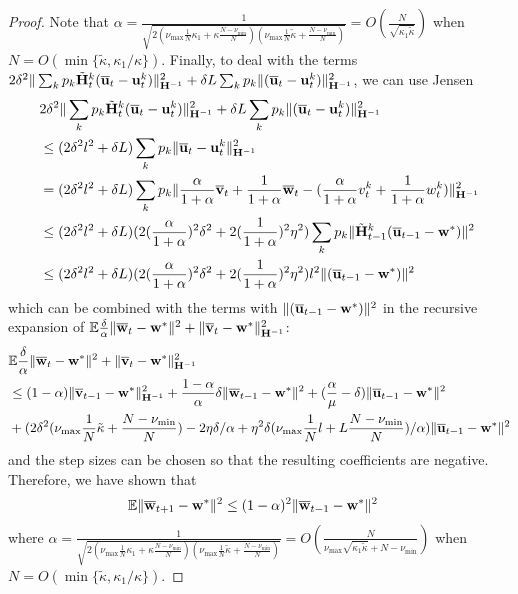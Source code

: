 \begin{proof}
	Note that $\alpha=\frac{1}{\sqrt{2(\nu_{\max}\frac{1}{N}\kappa_{1}+\kappa\frac{N-\nu_{\min}}{N})(\nu_{\max}\frac{1}{N}\tilde{\kappa}+\frac{N-\nu_{\min}}{N})}}=O(\frac{N}{\sqrt{\kappa_{1}\tilde{\kappa}}})$
	when $N=O(\min\{\tilde{\kappa},\kappa_{1}/\kappa\})$. Finally, to
	deal with the terms $2\delta^{2}\|\sum_{k}p_{k}\tilde{{\mathbf{H}}}_{t}^{k}({\overline{\mathbf{u}}}_{t}-{\mathbf{u}}_{t}^{k})\|_{{\mathbf{H}}^{-1}}^{2}+\delta L\sum_{k}p_{k}\|({\overline{\mathbf{u}}}_{t}-{\mathbf{u}}_{t}^{k})\|_{{\mathbf{H}}^{-1}}^{2}$,
	we can use Jensen
	\begin{align*}
	&2\delta^{2}\|\sum_{k}p_{k}\tilde{{\mathbf{H}}}_{t}^{k}({\overline{\mathbf{u}}}_{t}-{\mathbf{u}}_{t}^{k})\|_{{\mathbf{H}}^{-1}}^{2}+\delta L\sum_{k}p_{k}\|({\overline{\mathbf{u}}}_{t}-{\mathbf{u}}_{t}^{k})\|_{{\mathbf{H}}^{-1}}^{2} \\
	& \leq(2\delta^{2}l^{2}+\delta L)\sum_{k}p_{k}\|{\overline{\mathbf{u}}}_{t}-{\mathbf{u}}_{t}^{k}\|_{{\mathbf{H}}^{-1}}^{2}\\
	& =(2\delta^{2}l^{2}+\delta L)\sum_{k}p_{k}\|\frac{\alpha}{1+\alpha}{\overline{\mathbf{v}}}_{t}+\frac{1}{1+\alpha}{\overline{\mathbf{w}}}_{t}-(\frac{\alpha}{1+\alpha}v_{t}^{k}+\frac{1}{1+\alpha}w_{t}^{k})\|_{{\mathbf{H}}^{-1}}^{2}\\
	& \leq(2\delta^{2}l^{2}+\delta L)(2(\frac{\alpha}{1+\alpha})^{2}\delta^{2}+2(\frac{1}{1+\alpha})^{2}\eta^{2})\sum_{k}p_{k}\|\tilde{{\mathbf{H}}}_{t-1}^{k}({\overline{\mathbf{u}}}_{t-1}-{\mathbf{w}}^{\ast})\|^{2}\\
	& \leq(2\delta^{2}l^{2}+\delta L)(2(\frac{\alpha}{1+\alpha})^{2}\delta^{2}+2(\frac{1}{1+\alpha})^{2}\eta^{2})l^{2}\|({\overline{\mathbf{u}}}_{t-1}-{\mathbf{w}}^{\ast})\|^{2}
	\end{align*}
	which can be combined with the terms with $\|({\overline{\mathbf{u}}}_{t-1}-{\mathbf{w}}^{\ast})\|^{2}$
	in the recursive expansion of $\mathbb{E}\frac{\delta}{\alpha}\|{\overline{\mathbf{w}}}_{t}-{\mathbf{w}}^{\ast}\|^{2}+\|{\overline{\mathbf{v}}}_{t}-{\mathbf{w}}^{\ast}\|_{{\mathbf{H}}^{-1}}^{2}$:
	\begin{align*}
	& \mathbb{E}\frac{\delta}{\alpha}\|{\overline{\mathbf{w}}}_{t}-{\mathbf{w}}^{\ast}\|^{2}+\|{\overline{\mathbf{v}}}_{t}-{\mathbf{w}}^{\ast}\|_{{\mathbf{H}}^{-1}}^{2}\\
	& \leq(1-\alpha)\|{\overline{\mathbf{v}}}_{t-1}-{\mathbf{w}}^{\ast}\|_{{\mathbf{H}}^{-1}}^{2}+\frac{1-\alpha}{\alpha}\delta\|{\overline{\mathbf{w}}}_{t-1}-{\mathbf{w}}^{\ast}\|^{2}+(\frac{\alpha}{\mu}-\delta)\|{\overline{\mathbf{u}}}_{t-1}-{\mathbf{w}}^{\ast}\|^{2}\\
	& +(2\delta^{2}(\nu_{\max}\frac{1}{N}\tilde{\kappa}+\frac{N-\nu_{\min}}{N})-2\eta\delta/\alpha+\eta^{2}\delta(\nu_{\max}\frac{1}{N}l+L\frac{N-\nu_{\min}}{N})/\alpha)\|{\overline{\mathbf{u}}}_{t-1}-{\mathbf{w}}^{\ast}\|^{2}
	\end{align*}
	and the step sizes can be chosen so that the resulting coefficients
	are negative. Therefore, we have shown that 
	\begin{align*}
	\mathbb{E}\|{\overline{\mathbf{w}}}_{t+1}-{\mathbf{w}}^{\ast}\|^{2} & \leq(1-\alpha)^{2}\|{\overline{\mathbf{w}}}_{t-1}-{\mathbf{w}}^{\ast}\|^{2}
	\end{align*}
	where $\alpha=\frac{1}{\sqrt{2(\nu_{\max}\frac{1}{N}\kappa_{1}+\kappa\frac{N-\nu_{\min}}{N})(\nu_{\max}\frac{1}{N}\tilde{\kappa}+\frac{N-\nu_{\min}}{N})}}=O(\frac{N}{\nu_{\max}\sqrt{\kappa_{1}\tilde{\kappa}}+N-\nu_{\min}})$
	when $N=O(\min\{\tilde{\kappa},\kappa_{1}/\kappa\})$.
	

\end{proof}
